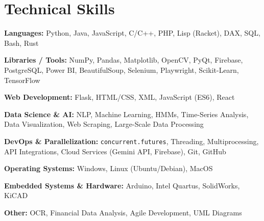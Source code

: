 \documentclass[11pt]{article}
\begin{document}
\section*{Technical Skills}
\begin{small}
\begin{compactitem}
    \item \textbf{Languages:} Python, Java, JavaScript, C/C++, PHP, Lisp (Racket), DAX, SQL, Bash, Rust
    \item \textbf{Libraries / Tools:} NumPy, Pandas, Matplotlib, OpenCV, PyQt, Firebase, PostgreSQL, Power BI, BeautifulSoup, Selenium, Playwright, Scikit-Learn, TensorFlow
    \item \textbf{Web Development:} Flask, HTML/CSS, XML, JavaScript (ES6), React
    \item \textbf{Data Science \& AI:} NLP, Machine Learning, HMMs, Time-Series Analysis, Data Visualization, Web Scraping, Large-Scale Data Processing
    \item \textbf{DevOps \& Parallelization:} \texttt{concurrent.futures}, Threading, Multiprocessing, API Integrations, Cloud Services (Gemini API, Firebase), Git, GitHub
    \item \textbf{Operating Systems:} Windows, Linux (Ubuntu/Debian), MacOS
    \item \textbf{Embedded Systems \& Hardware:} Arduino, Intel Quartus, SolidWorks, KiCAD
    \item \textbf{Other:} OCR, Financial Data Analysis, Agile Development, UML Diagrams
\end{compactitem}
\end{small}

\end{document}
